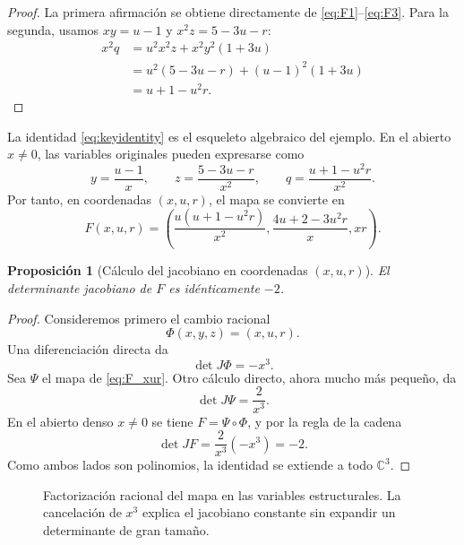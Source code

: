 \documentclass[11pt]{article}
\newtheorem{proposition}[theorem]{Proposici\'on}
\theoremstyle{definition}
\theoremstyle{remark}
\newcommand{\C}{\mathbb{C}}
\newcommand{\A}{\mathbb{A}}
\begin{document}
\begin{proof}
La primera afirmaci\'on se obtiene directamente de
\eqref{eq:F1}--\eqref{eq:F3}. Para la segunda, usamos
$xy=u-1$ y $x^2z=5-3u-r$:
\begin{align*}
x^2q
&=u^2x^2z+x^2y^2(1+3u)\\
&=u^2(5-3u-r)+(u-1)^2(1+3u)\\
&=u+1-u^2r.
\end{align*}
\end{proof}

La identidad \eqref{eq:keyidentity} es el esqueleto algebraico del ejemplo.
En el abierto $x\neq0$, las variables originales pueden expresarse como
\[
y=\frac{u-1}{x},\qquad
z=\frac{5-3u-r}{x^2},\qquad
q=\frac{u+1-u^2r}{x^2}.
\]
Por tanto, en coordenadas $(x,u,r)$, el mapa se convierte en
\begin{equation}\label{eq:F_xur}
F(x,u,r)=
\left(
\frac{u(u+1-u^2r)}{x^2},
\frac{4u+2-3u^2r}{x},
xr
\right).
\end{equation}

\begin{proposition}[C\'alculo del jacobiano en coordenadas $(x,u,r)$]
El determinante jacobiano de $F$ es id\'enticamente $-2$.
\end{proposition}

\begin{proof}
Consideremos primero el cambio racional
\[
\Phi(x,y,z)=(x,u,r).
\]
Una diferenciaci\'on directa da
\[
\det J\Phi=-x^3.
\]
Sea $\Psi$ el mapa de \eqref{eq:F_xur}. Otro c\'alculo directo, ahora mucho m\'as
peque\~no, da
\[
\det J\Psi=\frac{2}{x^3}.
\]
En el abierto denso $x\neq0$ se tiene $F=\Psi\circ\Phi$, y por la regla de la
cadena
\[
\det JF=\frac{2}{x^3}(-x^3)=-2.
\]
Como ambos lados son polinomios, la identidad se extiende a todo $\C^3$.
\end{proof}

\begin{figure}[htbp]
\centering
{}
\vspace{1mm}
\caption{Factorizaci\'on racional del mapa en las variables estructurales. La
cancelaci\'on de $x^3$ explica el jacobiano constante sin expandir un
determinante de gran tama\~no.}
\label{fig:structural-factorization}
\end{figure}
\end{document}

